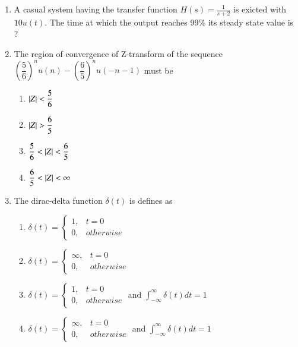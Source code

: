 \renewcommand{\theequation}{\theenumi}
\begin{enumerate}[label=\arabic*.,ref=\theenumi]

\item A casual system having the transfer function $H(s)=\frac{1}{s+2}$ is exicted with $10u(t)$. The time at which the output reaches 99\% its steady state value is ?
\\
\solution



\item The region of convergence of Z-transform of the sequence $\left(\dfrac{5}{6}\right)^nu(n) -\left(\dfrac{6}{5}\right)^nu(-n-1)$ must be
\begin{enumerate}[label = (\Alph*)]
\setlength\itemsep{0.7em}
    \item $\left\vert Z\right\vert < \dfrac{5}{6}$
    \item $\left\vert Z\right\vert > \dfrac{6}{5}$
    \item $\dfrac{5}{6} < \left\vert Z\right\vert < \dfrac{6}{5}$
    \item $\dfrac{6}{5} < \left\vert Z\right\vert < \infty$
\end{enumerate}
\solution

\item The dirac-delta function $\delta(t)$ is defines as 
\begin{enumerate}
    \item $\delta(t)=  \begin{cases}
 1 , & t=0\\
 0, & otherwise
 \end{cases}$
  \item $\delta(t)=  \begin{cases}
 \infty , & t=0\\
 0, & otherwise
 \end{cases}$
  \item $\delta(t)=  \begin{cases}
 1 , & t=0\\
 0, & otherwise
 \end{cases}$ and $\int_{-\infty}^{\infty} \delta(t)dt =1$
  \item $\delta(t)=  \begin{cases}
\infty , & t=0\\
 0, & otherwise
 \end{cases}$ and $\int_{-\infty}^{\infty} \delta(t)dt =1$

\end{enumerate}
\end{enumerate}

